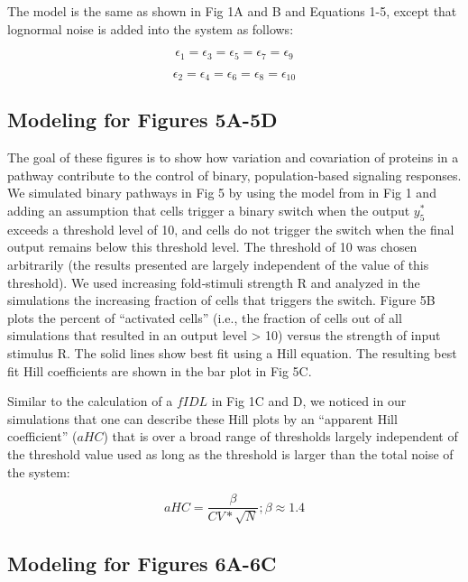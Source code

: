The model is the same as shown in Fig 1A and B and Equations 1-5, except that lognormal noise is added into the system as follows:

\begin{equation}\label{paper1_eq9}
\epsilon_1 = \epsilon_3 = \epsilon_5 = \epsilon_7 = \epsilon_9
\end{equation}

\begin{equation}\label{paper1_eq10}
\epsilon_2 = \epsilon_4 = \epsilon_6 = \epsilon_8 = \epsilon_10
\end{equation}

\subsection{Modeling for Figures 5A-5D}

The goal of these figures is to show how variation and covariation of proteins in a pathway contribute to the control of binary, population‐based signaling responses. We simulated binary pathways in Fig 5 by using the model from in Fig 1 and adding an assumption that cells trigger a binary switch when the output $y_5^*$ exceeds a threshold level of 10, and cells do not trigger the switch when the final output remains below this threshold level. The threshold of 10 was chosen arbitrarily (the results presented are largely independent of the value of this threshold). We used increasing fold‐stimuli strength R and analyzed in the simulations the increasing fraction of cells that triggers the switch. Figure 5B plots the percent of “activated cells” (i.e., the fraction of cells out of all simulations that resulted in an output level > 10) versus the strength of input stimulus R. The solid lines show best fit using a Hill equation. The resulting best fit Hill coefficients are shown in the bar plot in Fig 5C.

Similar to the calculation of a $fIDL$ in Fig  1C and D, we noticed in our simulations that one can describe these Hill plots by an “apparent Hill coefficient” ($aHC$) that is over a broad range of thresholds largely independent of the threshold value used as long as the threshold is larger than the total noise of the system:

\begin{equation}\label{paper1_eq11}
aHC = \frac{\beta}{CV * \sqrt{N}} ; \beta \approx 1.4
\end{equation}

\subsection{Modeling for Figures 6A-6C}

